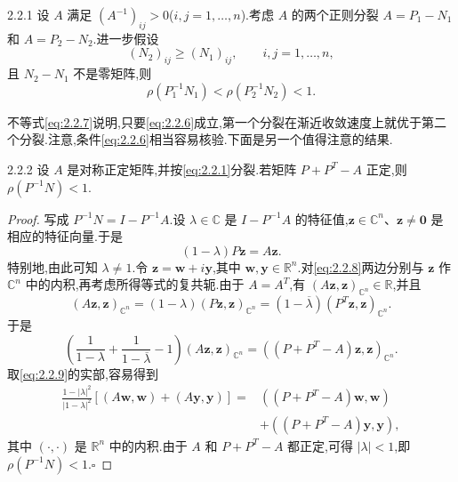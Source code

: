 \begin{theorem}[]{2.2.1}
设 \(A\) 满足 \((A^{-1})_{ij}>0\)(\(i,j=1,\ldots,n\)).考虑 \(A\) 的两个正则分裂 \(A=P_1-N_1\) 和 \(A=P_2-N_2\).进一步假设
\begin{equation}\label{eq:2.2.6}
  (N_2)_{ij}\ge(N_1)_{ij},\qquad i,j=1,\ldots,n,
\end{equation}
且 \(N_2-N_1\) 不是零矩阵,则
\begin{equation}\label{eq:2.2.7}
  \rho(P_1^{-1}N_1)<\rho(P_2^{-1}N_2)<1.
\end{equation}
\end{theorem}

不等式\eqref{eq:2.2.7}说明,只要\eqref{eq:2.2.6}成立,第一个分裂在渐近收敛速度上就优于第二个分裂.注意,条件\eqref{eq:2.2.6}相当容易核验.下面是另一个值得注意的结果.

\begin{theorem}{2.2.2}
设 \(A\) 是对称正定矩阵,并按\eqref{eq:2.2.1}分裂.若矩阵 \(P+P^T-A\) 正定,则 \(\rho(P^{-1}N)<1\).
\end{theorem}

\begin{proof}
写成 \(P^{-1}N=I-P^{-1}A\).设 \(\lambda\in\mathbb C\) 是 \(I-P^{-1}A\) 的特征值,\(\boldsymbol{z}\in\mathbb C^n\)、\(\boldsymbol{z}\ne\boldsymbol{0}\) 是相应的特征向量.于是
\begin{equation}\label{eq:2.2.8}
  (1-\lambda)P\boldsymbol{z}=A\boldsymbol{z}.
\end{equation}
特别地,由此可知 \(\lambda\ne1\).令 \(\boldsymbol{z}=\boldsymbol{w}+i\boldsymbol{y}\),其中 \(\boldsymbol{w},\boldsymbol{y}\in\mathbb R^n\).对\eqref{eq:2.2.8}两边分别与 \(\boldsymbol{z}\) 作 \(\mathbb C^n\) 中的内积,再考虑所得等式的复共轭.由于 \(A=A^T\),有 \((A\boldsymbol{z},\boldsymbol{z})_{\mathbb C^n}\in\mathbb R\),并且
\[
  (A\boldsymbol{z},\boldsymbol{z})_{\mathbb C^n}
  =(1-\lambda)(P\boldsymbol{z},\boldsymbol{z})_{\mathbb C^n}
  =(1-\overline\lambda)(P^T\boldsymbol{z},\boldsymbol{z})_{\mathbb C^n}.
\]
于是
\begin{equation}\label{eq:2.2.9}
  \left(\frac1{1-\lambda}+\frac1{1-\overline\lambda}-1\right)
  (A\boldsymbol{z},\boldsymbol{z})_{\mathbb C^n}
  =((P+P^T-A)\boldsymbol{z},\boldsymbol{z})_{\mathbb C^n}.
\end{equation}
取\eqref{eq:2.2.9}的实部,容易得到
\[
  \begin{aligned}
    \frac{1-|\lambda|^2}{|1-\lambda|^2}
     [(A\boldsymbol{w},\boldsymbol{w})+(A\boldsymbol{y},\boldsymbol{y})]
    ={}&((P+P^T-A)\boldsymbol{w},\boldsymbol{w})\\
      &+((P+P^T-A)\boldsymbol{y},\boldsymbol{y}),
  \end{aligned}
\]
其中 \((\cdot,\cdot)\) 是 \(\mathbb R^n\) 中的内积.由于 \(A\) 和 \(P+P^T-A\) 都正定,可得 \(|\lambda|<1\),即 \(\rho(P^{-1}N)<1\).\hfill\(\square\)
\end{proof}


